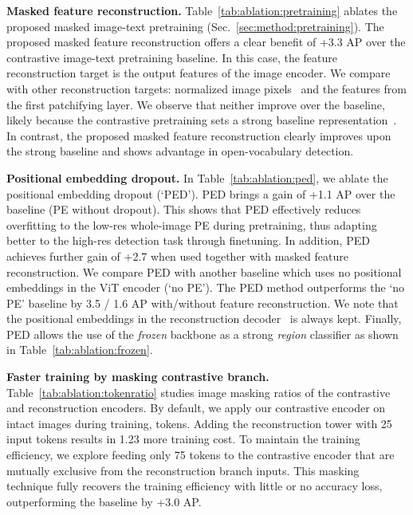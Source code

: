 \documentclass[10pt,twocolumn,letterpaper]{article}
\newcommand{\tabref}[1]{Table~\ref{#1}}
\newcommand{\secref}[1]{Sec.~\ref{#1}}
\renewcommand{\paragraph}[1]{\vspace{1mm}\noindent\textbf{#1}}
\begin{document}
\paragraph{Masked feature reconstruction.}\quad
\tabref{tab:ablation:pretraining} ablates the proposed masked image-text pretraining (\secref{sec:method:pretraining}). The proposed masked feature reconstruction offers a clear benefit of +3.3 AP over the contrastive image-text pretraining baseline. In this case, the feature reconstruction target is the output features of the image encoder. We compare with other reconstruction targets: normalized image pixels~\cite{he2022masked} and the features from the first patchifying layer. We observe that neither improve over the baseline, likely because the contrastive pretraining sets a strong baseline representation~\cite{gu2022openvocabulary,dong2022clip,kuo2022f}. In contrast, the proposed masked feature reconstruction clearly improves upon the strong baseline and shows advantage in open-vocabulary detection.



\paragraph{Positional embedding dropout.}\quad
In \tabref{tab:ablation:ped}, we ablate the positional embedding dropout (`PED'). PED brings a gain of +1.1 AP over the baseline (PE without dropout). This shows that PED effectively reduces overfitting to the low-res whole-image PE during pretraining, thus adapting better to the high-res detection task through finetuning. In addition, PED achieves further gain of +2.7 when used together with masked feature reconstruction. We compare PED with another baseline which uses no positional embeddings in the ViT encoder (`no PE'). The PED method outperforms the `no PE' baseline by 3.5 / 1.6 AP with/without feature reconstruction. We note that the positional embeddings in the reconstruction decoder~\cite{he2022masked} is always kept. Finally, PED allows the use of the \textit{frozen} backbone as a strong \textit{region} classifier as shown in \tabref{tab:ablation:frozen}. 



\paragraph{Faster training by masking contrastive branch.}\quad
\tabref{tab:ablation:tokenratio} studies image masking ratios of the contrastive and reconstruction encoders. By default, we apply our contrastive encoder on intact images during training,  tokens. Adding the reconstruction tower with 25 input tokens results in 1.23 more training cost. To maintain the training efficiency, we explore feeding only 75 tokens to the contrastive encoder that are mutually exclusive from the reconstruction branch inputs. This masking technique fully recovers the training efficiency with little or no accuracy loss, outperforming the baseline by +3.0 AP.
\end{document}
